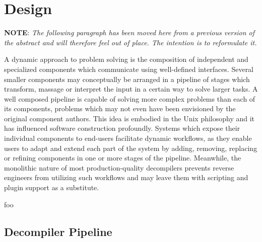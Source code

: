 
\section{Design}


\textbf{NOTE}: \textit{The following paragraph has been moved here from a previous version of the abstract and will therefore feel out of place. The intention is to reformulate it.}

A dynamic approach to problem solving is the composition of independent and specialized components which communicate using well-defined interfaces. Several smaller components may conceptually be arranged in a pipeline of stages which transform, massage or interpret the input in a certain way to solve larger tasks. A well composed pipeline is capable of solving more complex problems than each of its components, problems which may not even have been envisioned by the original component authors. This idea is embodied in the Unix philosophy and it has influenced software construction profoundly. Systems which expose their individual components to end-users facilitate dynamic workflows, as they enable users to adapt and extend each part of the system by adding, removing, replacing or refining components in one or more stages of the pipeline. Meanwhile, the monolithic nature of most production-quality decompilers prevents reverse engineers from utilizing such workflows and may leave them with scripting and plugin support as a substitute.

%


foo


\subsection{Decompiler Pipeline}

